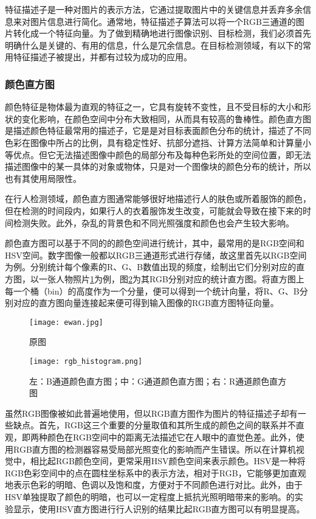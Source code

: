   特征描述子是一种对图片的表示方法，它通过提取图片中的关键信息并丢弃多余信息来对图片信息进行简化。通常地，特征描述子算法可以将一个RGB三通道的图片转化成一个特征向量。为了做到精确地进行图像识别、目标检测，我们必须首先明确什么是关键的、有用的信息，什么是冗余信息。在目标检测领域，有以下的常用特征描述子被提出，并都有过较为成功的应用。

\subsubsection{颜色直方图}

  颜色特征是物体最为直观的特征之一，它具有旋转不变性，且不受目标的大小和形状的变化影响，在颜色空间中分布大致相同，从而具有较高的鲁棒性。颜色直方图是描述颜色特征最常用的描述子，它是是对目标表面颜色分布的统计，描述了不同色彩在图像中所占的比例，具有稳定性好、抗部分遮挡、计算方法简单和计算量小等优点。但它无法描述图像中颜色的局部分布及每种色彩所处的空间位置，即无法描述图像中的某一具体的对象或物体，只是对一个图像块的颜色分布的统计，所以也有其使用局限性。

  在行人检测领域，颜色直方图通常能够很好地描述行人的肤色或所着服饰的颜色，但在检测的时间段内，如果行人的衣着服饰发生改变，可能就会导致在接下来的时间检测失败。此外，杂乱的背景色和不同光照强度和颜色也会产生较大影响。

  颜色直方图可以基于不同的的颜色空间进行统计，其中，最常用的是RGB空间和HSV空间。数字图像一般都以RGB三通道形式进行存储，故这里首先以RGB空间为例。分别统计每个像素的R、G、B数值出现的频度，绘制出它们分别对应的直方图，以一张人物照片\ref{fig:ewan}为例，图\ref{fig:rgbhistogram}为其RGB分别对应的统计直方图。将直方图上每一个桶（bin）的高度作为一个分量，便可以得到一个统计向量，将R、G、B分别对应的直方图向量连接起来便可得到输入图像的RGB直方图特征向量。

\begin{figure}[htb]
  \centering
  \texttt{[image: ewan.jpg]}
  \caption{原图}
  \label{fig:ewan}
\end{figure}

\begin{figure}[htb]
  \centering
  \texttt{[image: rgb\_histogram.png]}
  \caption{左：B通道颜色直方图；中：G通道颜色直方图；右：R通道颜色直方图}
  \label{fig:rgbhistogram}
\end{figure}

  虽然RGB图像被如此普遍地使用，但以RGB直方图作为图片的特征描述子却有一些缺点。首先，RGB这三个重要的分量取值和其所生成的颜色之间的联系并不直观，即两种颜色在RGB空间中的距离无法描述它在人眼中的直觉色差。此外，使用RGB直方图的检测器容易受局部光照变化的影响而产生错误。所以在计算机视觉中，相比起RGB颜色空间，更常采用HSV颜色空间来表示颜色。HSV是一种将RGB色彩空间中的点在圆柱坐标系中的表示方法，相对于RGB，它能够更加直观地表示色彩的明暗、色调以及饱和度，方便对于不同颜色进行对比。此外，由于HSV单独提取了颜色的明暗，也可以一定程度上抵抗光照明暗带来的影响。\citet{sural2002segmentation}的实验显示，使用HSV直方图进行行人识别的结果比起RGB直方图可以有明显提高。

